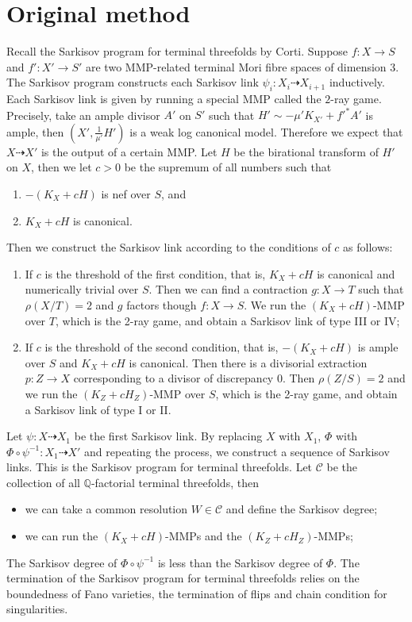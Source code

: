 \documentclass[11pt]{amsart}
\begin{document}
\section{Original method}
Recall the Sarkisov program for terminal threefolds by Corti. Suppose $f:X\to S$ and $f':X'\to S'$ are two MMP-related terminal Mori fibre spaces of dimension 3.
The Sarkisov program constructs each Sarkisov link $\psi_i:X_{i}\dashrightarrow X_{i+1}$ inductively. Each Sarkisov link is given by running a special MMP called the $2$-ray game. Precisely, take an ample divisor $A'$ on $S'$ such that $H'\sim -\mu'K_{X'}+f'^*A'$  is ample, then $(X',\frac{1}{\mu'}H')$ is a weak log canonical model.  Therefore we expect that $X\dashrightarrow X'$ is the output of a certain MMP. 
Let $H$ be the birational transform of $H'$ on $X$, then we let $c>0$ be the supremum of all numbers such that 
\begin{enumerate}
  \item $-(K_{X}+cH)$ is nef over $S$, and 
  \item $K_{X}+cH$ is  canonical.
\end{enumerate}
Then we construct the Sarkisov link according  to the conditions of $c$ as follows:
\begin{enumerate}
  \item If $c$ is the threshold of the first condition, that is, $K_{X}+cH$ is canonical and numerically trivial over $S$. Then we can find a contraction $g:X \to T$ such that $\rho(X/T)=2$ and $g$ factors though $f:X \to S$.  We run the $(K_X+cH)$-MMP over $T$, which is the 2-ray game, and obtain a Sarkisov link of type III or IV;
  \item If $c$ is the threshold of the second condition, that is, $-(K_{X}+cH)$ is ample over $S$ and $K_{X}+cH$ is canonical. Then there is a divisorial extraction $p:Z\to X$ corresponding to a divisor of discrepancy $0$. Then  $\rho(Z/S)=2$ and  we run the $(K_Z+cH_Z)$-MMP over $S$, which is the 2-ray game, and obtain a Sarkisov link of type I or II. 
\end{enumerate}
Let $\psi:X\dashrightarrow  X_{1}$ be the first Sarkisov link. By replacing $X$ with $X_{1}$, $\Phi$ with $\Phi\circ\psi^{-1}:X_1\dashrightarrow X'$ and repeating the process, we construct a sequence of Sarkisov links. This is the Sarkisov program for terminal threefolds. 
Let $\mathcal{C}$ be the collection of all $\mathbb{Q}$-factorial terminal threefolds, then  
\begin{itemize}
    \item we can take a common resolution $W\in \mathcal{C}$ and define the Sarkisov degree;
    \item we can run the $(K_X+cH)$-MMPs and the $(K_Z+cH_Z)$-MMPs;
\end{itemize}
The Sarkisov degree of $\Phi\circ \psi^{-1}$ is less than the Sarkisov degree of $\Phi$.
The termination of the Sarkisov program for terminal threefolds relies on the boundedness of Fano varieties, the termination of flips and chain condition for singularities. 
\end{document}
